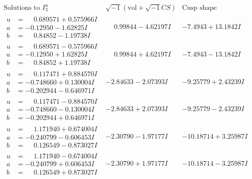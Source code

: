 \documentclass[1p]{elsarticle_modified}
\theoremstyle{definition}
\newcommand{\I}{\sqrt{-1}}
\begin{document}
$$\begin{array}{c|c|c}  
\text{Solutions to }I^u_{3}& \I (\text{vol} + \sqrt{-1}CS) & \text{Cusp shape}\\
 \hline 
\begin{aligned}
u &= \phantom{-}0.689571 + 0.575966 I \\
a &= -0.12950 - 1.62825 I \\
b &= \phantom{-}0.84852 - 1.19738 I\end{aligned}
 & \phantom{-}0.99844 - 4.62197 I & -7.4943 + 13.1842 I \\ \hline\begin{aligned}
u &= \phantom{-}0.689571 - 0.575966 I \\
a &= -0.12950 + 1.62825 I \\
b &= \phantom{-}0.84852 + 1.19738 I\end{aligned}
 & \phantom{-}0.99844 + 4.62197 I & -7.4943 - 13.1842 I \\ \hline\begin{aligned}
u &= \phantom{-}0.117471 + 0.884570 I \\
a &= -0.748660 + 0.130004 I \\
b &= -0.202944 - 0.646971 I\end{aligned}
 & -2.84633 - 2.07393 I & -9.25779 + 2.43239 I \\ \hline\begin{aligned}
u &= \phantom{-}0.117471 - 0.884570 I \\
a &= -0.748660 - 0.130004 I \\
b &= -0.202944 + 0.646971 I\end{aligned}
 & -2.84633 + 2.07393 I & -9.25779 - 2.43239 I \\ \hline\begin{aligned}
u &= \phantom{-}1.171940 + 0.674004 I \\
a &= -0.240799 - 0.606453 I \\
b &= \phantom{-}0.126549 - 0.873027 I\end{aligned}
 & -2.30790 - 1.97177 I & -10.18714 + 3.25987 I \\ \hline\begin{aligned}
u &= \phantom{-}1.171940 - 0.674004 I \\
a &= -0.240799 + 0.606453 I \\
b &= \phantom{-}0.126549 + 0.873027 I\end{aligned}
 & -2.30790 + 1.97177 I & -10.18714 - 3.25987 I \\ \hline\begin{aligned}

\end{aligned}
\end{array}$$
\end{document}
